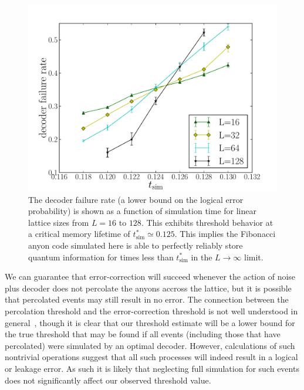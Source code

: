 \documentclass[aps, prl, letterpaper, twocolumn, superscriptaddress, notitlepage, 10pt]{revtex4-1}
\begin{document}
\begin{figure}[t!]
\begin{center}
	\includegraphics[width=\columnwidth]{anyons-kyle.pdf}
\caption{The decoder failure rate (a lower bound on the logical error probability) is shown as a function of simulation time for linear lattice sizes from $L=16$ to $128$. 
This exhibits threshold behavior at a critical memory lifetime of $t_{\mathrm{sim}}^*\simeq 0.125$. 
This implies the Fibonacci anyon code simulated here is able to perfectly reliably store quantum information for times less than $t_{\mathrm{sim}}^*$ in the $L\to \infty$ limit.}
\label{f:threshold}
\end{center}
\vspace{-10pt}
\end{figure}

We can guarantee that error-correction will succeed whenever
the action of noise plus decoder 
does not percolate the anyons accross the lattice,
but it is possible that percolated events may still result in no error. 
The connection between the percolation threshold and the error-correction threshold 
is not well understood in general~\cite{Hastings2014}, though it is clear 
that our threshold estimate will be a lower bound for 
the true threshold that may be found if all events 
(including those that have percolated) were simulated by an optimal decoder. 
However, calculations of such nontrivial operations suggest that all such 
processes will indeed result in a logical or leakage error.
As such it is likely that neglecting full simulation for 
such events does not significantly affect our observed threshold value.
\end{document}
